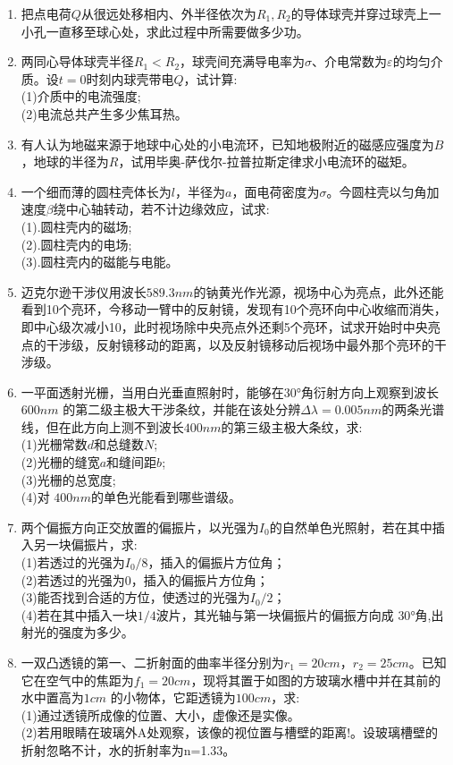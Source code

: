 
\begin{enumerate}
\item 把点电荷$Q$从很远处移相内、外半径依次为$R_1,R_2$的导体球壳并穿过球壳上一小孔一直移至球心处，求此过程中所需要做多少功。
\item 两同心导体球壳半径$R_1<R_2$，球壳间充满导电率为$\sigma$、介电常数为$\varepsilon$的均匀介质。设$t=0$时刻内球壳带电$Q$，试计算:\\
(1)介质中的电流强度;\\
(2)电流总共产生多少焦耳热。
\item 有人认为地磁来源于地球中心处的小电流环，已知地极附近的磁感应强度为$B$，地球的半径为$R$，试用毕奥-萨伐尔-拉普拉斯定律求小电流环的磁矩。
\item 一个细而薄的圆柱壳体长为$l$，半径为$a$，面电荷密度为$\sigma$。今圆柱壳以匀角加速度$\beta$绕中心轴转动，若不计边缘效应，试求:\\
(1).圆柱壳内的磁场;\\
(2).圆柱壳内的电场;\\
(3).圆柱壳内的磁能与电能。
\item 迈克尔逊干涉仪用波长$589.3nm$的钠黄光作光源，视场中心为亮点，此外还能看到10个亮环，今移动一臂中的反射镜，发现有10个亮环向中心收缩而消失，即中心级次减小10，此时视场除中央亮点外还剩5个亮环，试求开始时中央亮点的干涉级，反射镜移动的距离，以及反射镜移动后视场中最外那个亮环的干涉级。
\item 一平面透射光栅，当用白光垂直照射时，能够在$30$°角衍射方向上观察到波长 $600nm$ 的第二级主极大干涉条纹，并能在该处分辨$\Delta \lambda=0.005nm$的两条光谱线，但在此方向上测不到波长$400nm$的第三级主极大条纹，求:\\
(1)光栅常数$d$和总缝数$N$;\\
(2)光栅的缝宽$a$和缝间距$b$;\\
(3)光栅的总宽度;\\
(4)对 $400nm $的单色光能看到哪些谱级。
\item 两个偏振方向正交放置的偏振片，以光强为$I_0$的自然单色光照射，若在其中插入另一块偏振片，求:\\
(1)若透过的光强为$I_0/8$，插入的偏振片方位角；\\
(2)若透过的光强为$0$，插入的偏振片方位角；\\
(3)能否找到合适的方位，使透过的光强为$I_0/2$；\\
(4)若在其中插入一块$ 1/4$波片，其光轴与第一块偏振片的偏振方向成 $30$°角,出射光的强度为多少。
\item 一双凸透镜的第一、二折射面的曲率半径分别为$r_1=20cm，r_2=25cm$。已知它在空气中的焦距为$f_1=20cm$，现将其置于如图的方玻璃水槽中并在其前的水中置高为$1cm$ 的小物体，它距透镜为$100cm$，求:\\
(1)通过透镜所成像的位置、大小，虚像还是实像。\\
(2)若用眼睛在玻璃外A处观察，该像的视位置与槽壁的距离!。设玻璃槽壁的折射忽略不计，水的折射率为n=1.33。
\end{enumerate}
